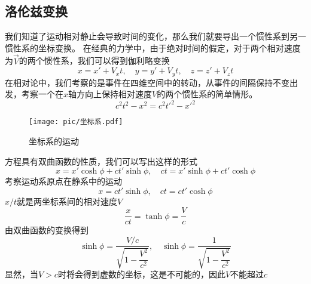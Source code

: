 \documentclass[12pt]{report}
\begin{document}
\subsection{洛伦兹变换}
我们知道了运动相对静止会导致时间的变化，那么我们就要导出一个惯性系到另一惯性系的坐标变换。
在经典的力学中，由于绝对时间的假定，对于两个相对速度为$\vec{V}$的两个惯性系，我们可以得到伽利略变换
$$x={x'}+V_x t,\quad y={y'}+V_y t,\quad z={z'}+V_z t$$
在相对论中，我们考察的是事件在四维空间中的转动，从事件的间隔保持不变出发，考察一个在$x$轴方向上保持相对速度$V$的两个惯性系的简单情形。
$$c^2 t^2-x^2=c^2 {t'}^2-{x'}^2$$
\begin{figure}[ht]
    \centering
    \texttt{[image: pic/坐标系.pdf]}
    \caption{\footnotesize 坐标系的运动}
\end{figure}
方程具有双曲函数的性质，我们可以写出这样的形式
$$x=x'\cosh \phi +c{t'}\sinh \phi ,\quad ct=x'\sinh \phi +c{t'}\cosh \phi$$
考察运动系原点在静系中的运动
$$x=c{t'}\sinh \phi ,\quad ct=c{t'}\cosh \phi$$
$x/t$就是两坐标系间的相对速度$V$
$$\frac{x}{ct}=\tanh \phi=\frac{V}{c}$$
由双曲函数的变换得到
$$\sinh \phi =\frac{V/c}{\sqrt{1-\dfrac{V^2}{c^2}}},\quad \sinh \phi =\frac{1}{\sqrt{1-\dfrac{V^2}{c^2}}}$$
显然，当$V>c$时将会得到虚数的坐标，这是不可能的，因此$V$不能超过$c$ \par
\end{document}
